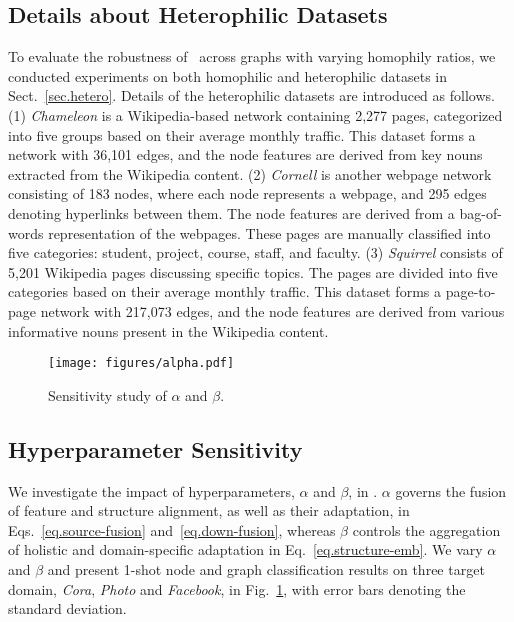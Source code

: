\subsection{Details about Heterophilic Datasets}\label{app.hetero}
To evaluate the robustness of \model\ across graphs with varying homophily ratios, we conducted experiments on both homophilic and heterophilic datasets in Sect.~\ref{sec.hetero}. Details of the heterophilic datasets are introduced as follows.
(1) \emph{Chameleon} \cite{rozemberczki2021multi} is a Wikipedia-based network containing 2,277 pages, categorized into five groups based on their average monthly traffic. This dataset forms a network with 36,101 edges, and the node features are derived from key nouns extracted from the Wikipedia content. %
(2) \emph{Cornell} \cite{pei2020geom} is another webpage network consisting of 183 nodes, where each node represents a webpage, and 295 edges denoting hyperlinks between them. The node features are derived from a bag-of-words representation of the webpages. These pages are manually classified into five categories: student, project, course, staff, and faculty. %
(3) \emph{Squirrel} \cite{rozemberczki2021multi} consists of 5,201 Wikipedia pages discussing specific topics. The pages are divided into five categories based on their average monthly traffic. This dataset forms a page-to-page network with 217,073 edges, and the node features are derived from various informative nouns present in the Wikipedia content. %

\begin{figure}[t]
\centering 
\texttt{[image: figures/alpha.pdf]}%
 \vspace{-4mm}%
\caption{Sensitivity study of $\alpha$ and $\beta$.}
\label{fig.hyperpara}
\end{figure}

\subsection{Hyperparameter Sensitivity}\label{app.hyperpara}
We investigate the impact of hyperparameters, $\alpha$ and $\beta$, in \model. $\alpha$ governs the fusion of feature and structure alignment, as well as their adaptation, in Eqs.~\eqref{eq.source-fusion} and~\eqref{eq.down-fusion}, whereas $\beta$ controls the aggregation of holistic and domain-specific adaptation in Eq.~\eqref{eq.structure-emb}. We vary $\alpha$ and $\beta$ and present 1-shot node and graph classification results on three target domain, \textit{Cora}, \textit{Photo} and \textit{Facebook}, in Fig.~\ref{fig.hyperpara}, with error bars denoting the standard deviation. 


